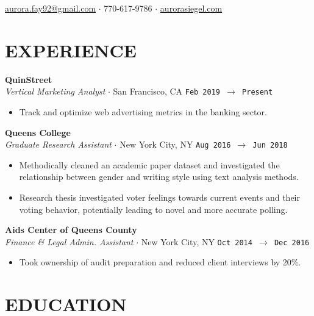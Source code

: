 \documentclass[margin, line, 11pt]{res}
\begin{document}
\noindent\hspace{-1.0in}{\LARGE\bf Aurora Siegel}
\hfill \href{mailto:aurora.fay92@gmail.com}{aurora.fay92@gmail.com}
$\cdot$ 770-617-9786
$\cdot$ \href{http://aurorasiegel.com}{aurorasiegel.com}

\begin{resume}

\section{EXPERIENCE}

{\bf QuinStreet}\vspace{0.04in}
\\ {\it Vertical Marketing Analyst} $\cdot$ San Francisco, CA \hfill\texttt{Feb 2019 $\to$ Present}\vspace{0.04in}
\begin{itemize}
\item Track and optimize web advertising metrics in the banking sector.
\end{itemize}

{\bf Queens College}\vspace{0.04in}
\\ {\it Graduate Research Assistant} $\cdot$ New York City, NY \hfill\texttt{Aug 2016 $\to$ Jun 2018}\vspace{0.04in}
\begin{itemize}
\item Methodically cleaned an academic paper dataset and investigated the relationship between gender and writing style using text analysis methods. 
\item Research thesis investigated voter feelings towards current events and their voting behavior, potentially leading to novel and more accurate polling.
\end{itemize}

{\bf Aids Center of Queens County}\vspace{0.04in}
\\ {\it Finance \& Legal Admin. Assistant} $\cdot$ New York City, NY \hfill\texttt{Oct 2014 $\to$ Dec 2016}\vspace{0.04in}
\begin{itemize}
\item Took ownership of audit preparation and reduced client interviews by 20\%.
\end{itemize}

\section{EDUCATION}


\end{resume}
\end{document}
